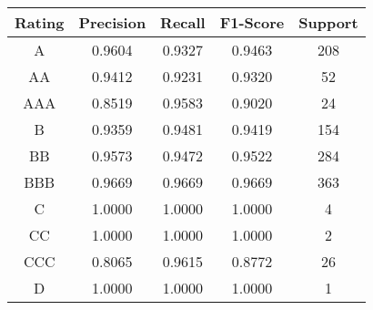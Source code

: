\footnotesize
\begin{tabular}{ccccc}
\toprule
Rating & Precision & Recall & F1-Score & Support \\
\midrule
A & 0.9604 & 0.9327 & 0.9463 & 208 \\
AA & 0.9412 & 0.9231 & 0.9320 & 52 \\
AAA & 0.8519 & 0.9583 & 0.9020 & 24 \\
B & 0.9359 & 0.9481 & 0.9419 & 154 \\
BB & 0.9573 & 0.9472 & 0.9522 & 284 \\
BBB & 0.9669 & 0.9669 & 0.9669 & 363 \\
C & 1.0000 & 1.0000 & 1.0000 & 4 \\
CC & 1.0000 & 1.0000 & 1.0000 & 2 \\
CCC & 0.8065 & 0.9615 & 0.8772 & 26 \\
D & 1.0000 & 1.0000 & 1.0000 & 1 \\
\bottomrule
\end{tabular}

\normalsize